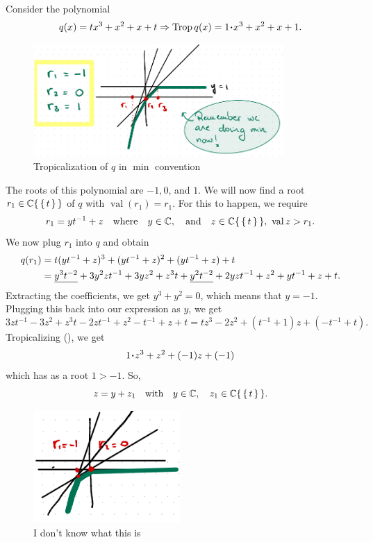 \documentclass[12pt]{memoir}
\DeclareMathOperator{\val}{val}
\DeclareMathOperator{\Trop}{Trop}
\theoremstyle{definition}
\begin{document}
\begin{Ex}
    Consider the polynomial 
    $$q(x)=tx^3+x^2+x+t\To\Trop q(x)=1\.x^3+x^2+x+1.$$
    \begin{figure}[h!]
        \centering
        \includegraphics[width=0.85\textwidth]{figs/fig5-1RealizabilityExampleProof.png}
        \caption{Tropicalization of $q$ in $\min$ convention}
        \label{fig:5.1-RealizabilityExampleProof}
    \end{figure}

    The roots of this polynomial are $-1,0$, and $1$. We will now find a root $r_1\in\mathbb{C}\{\,\{\,t\,\}\,\}$ of $q$ with $\val(r_1)=r_1$. For this to happen, we require
    $$r_1=yt^{-1}+z\word{where}y\in\bC,\word{and}z\in\bC\set{\set{t}},\ \val z>r_1.$$
    We now plug $r_1$ into $q$ and obtain
    \begin{align*}
        q(r_1)&=t(yt^{-1}+z)^3+(yt^{-1}+z)^2+(yt^{-1}+z)+t\\
        &=\underline{y^3t^{-2}}+3y^2zt^{-1}+3yz^2+z^3t+\underline{y^2t^{-2}}+2yzt^{-1}+z^2+yt^{-1}+z+t.
    \end{align*}
    Extracting the coefficients, we get $y^3+y^2=0$, which means that $y=-1$. Plugging this back into our expression as $y$, we get 
    $$3zt^{-1}-3z^2+z^3t-2zt^{-1}+z^2-t^{-1}+z+t=tz^3-2z^2+(t^{-1}+1)z+(-t^{-1}+t).$$
    Tropicalizing (), we get 
    $$1\.z^3+z^2+(-1)z+(-1)$$
    which has as a root $1>-1$. So,
    $$z=y+z_1\quad\text{with}\quad y\in\mathbb{C},\quad z_1\in\mathbb{C}\{\,\{\,t\,\}\,\}.$$  
    \begin{figure}[h!]
        \centering
        \includegraphics[width=0.5\textwidth]{figs/fig5-2EndOfProofFiniteCase.png}
        \caption{I don't know what this is}
        \label{fig:5.2-EndOfProofFiniteCase}
    \end{figure}
\end{Ex} 
\end{document}
